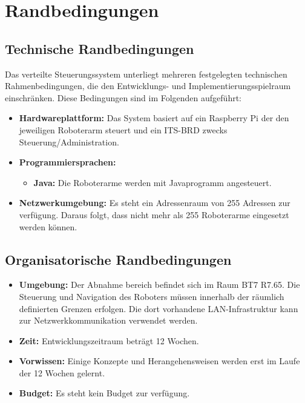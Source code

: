 

\chapter{Randbedingungen}

\section{Technische Randbedingungen}

Das verteilte Steuerungssystem unterliegt mehreren festgelegten technischen Rahmenbedingungen, die den Entwicklungs- und Implementierungsspielraum einschränken. Diese Bedingungen sind im Folgenden aufgeführt:

\begin{itemize}
    \item \textbf{Hardwareplattform:}  Das System basiert auf ein Raspberry Pi der den jeweiligen Roboterarm steuert und ein ITS-BRD zwecks Steuerung/Administration.
    
    \item \textbf{Programmiersprachen:}  
    \begin{itemize}
        \item \textbf{Java:} Die Roboterarme werden mit Javaprogramm angesteuert.
    \end{itemize}
    \item \textbf{Netzwerkumgebung:} Es steht ein Adressenraum von 255 Adressen zur verfügung. Daraus folgt, dass nicht mehr als 255 Roboterarme eingesetzt werden können.

    
\end{itemize}

\section{Organisatorische Randbedingungen}
\begin{itemize}

    \item \textbf{Umgebung:}  
    Der Abnahme bereich befindet sich im Raum BT7 R7.65. Die Steuerung und Navigation des Roboters müssen innerhalb der räumlich definierten Grenzen erfolgen. Die dort vorhandene LAN-Infrastruktur kann zur Netzwerkkommunikation verwendet werden.
    \item \textbf{Zeit:} Entwicklungszeitraum beträgt 12 Wochen. 
    \item \textbf{Vorwissen:} Einige Konzepte und Herangehensweisen werden erst im Laufe der 12 Wochen gelernt.
    \item \textbf{Budget:} Es steht kein Budget zur verfügung.

\end{itemize}

